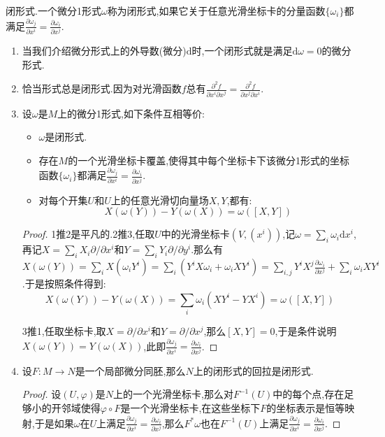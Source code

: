 闭形式.一个微分1形式$\omega$称为闭形式,如果它关于任意光滑坐标卡的分量函数$\{\omega_i\}$都满足$\frac{\partial\omega_j}{\partial x^i}=\frac{\partial\omega_i}{\partial x^j}$.
\begin{enumerate}
	\item 当我们介绍微分形式上的外导数(微分)$\mathrm{d}$时,一个闭形式就是满足$\mathrm{d}\omega=0$的微分形式.
	\item 恰当形式总是闭形式.因为对光滑函数$f$总有$\frac{\partial^2f}{\partial x^i\partial x^j}=\frac{\partial^2f}{\partial x^j\partial x^i}$.
	\item 设$\omega$是$M$上的微分1形式,如下条件互相等价:
	\begin{itemize}
		\item $\omega$是闭形式.
		\item 存在$M$的一个光滑坐标卡覆盖,使得其中每个坐标卡下该微分1形式的坐标函数$\{\omega_i\}$都满足$\frac{\partial\omega_j}{\partial x^i}=\frac{\partial\omega_i}{\partial x^j}$.
		\item 对每个开集$U$和$U$上的任意光滑切向量场$X,Y$,都有:
		$$X(\omega(Y))-Y(\omega(X))=\omega([X,Y])$$
	\end{itemize}
    \begin{proof}
    	
    	1推2是平凡的.2推3,任取$U$中的光滑坐标卡$(V,(x^i))$,记$\omega=\sum_i\omega_i\mathrm{d}x^i$,再记$X=\sum_iX_i\partial/\partial x^i$和$Y=\sum_iY_i\partial/\partial y^i$.那么有$X(\omega(Y))=\sum_iX(\omega_iY^i)=\sum_i(Y^iX\omega_i+\omega_iXY^i)=\sum_{i,j}Y^iX^j\frac{\partial\omega_i}{\partial x^j}+\sum_i\omega_iXY^i$.于是按照条件得到:
    	$$X(\omega(Y))-Y(\omega(X))=\sum_i\omega_i(XY^i-YX^i)=\omega([X,Y])$$
    	
    	3推1,任取坐标卡,取$X=\partial/\partial x^i$和$Y=\partial/\partial x^j$,那么$[X,Y]=0$,于是条件说明$X(\omega(Y))=Y(\omega(X))$,此即$\frac{\partial\omega_j}{\partial x^i}=\frac{\partial\omega_i}{\partial x^j}$.
    \end{proof}
    \item 设$F:M\to N$是一个局部微分同胚,那么$N$上的闭形式的回拉是闭形式.
    \begin{proof}
    	
    	设$(U,\varphi)$是$N$上的一个光滑坐标卡,那么对$F^{-1}(U)$中的每个点,存在足够小的开邻域使得$\varphi\circ F$是一个光滑坐标卡,在这些坐标下$F$的坐标表示是恒等映射,于是如果$\omega$在$U$上满足$\frac{\partial\omega_j}{\partial x^i}=\frac{\partial\omega_i}{\partial x^j}$,那么$F^*\omega$也在$F^{-1}(U)$上满足$\frac{\partial\omega_j}{\partial x^i}=\frac{\partial\omega_i}{\partial x^j}$.
    \end{proof}
\end{enumerate}

